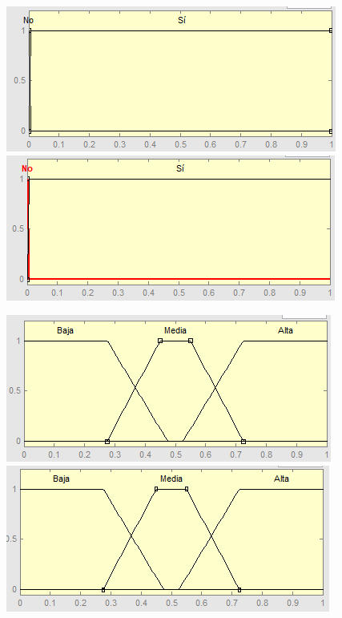 \begin{figure}[H]
	\centering
	\begin{minipage}{.5\textwidth}
		\centering
		\includegraphics[scale=0.67]{images/variables/es.png}
	\end{minipage}%
	\begin{minipage}{.5\textwidth}
		\centering
		\includegraphics[scale=0.67]{images/variables/ps.png}
	\end{minipage}
\end{figure}

\begin{figure}[H]
	\centering
	\begin{minipage}{.5\textwidth}
		\centering
		\includegraphics[scale=0.67]{images/variables/vrpa.png}
	\end{minipage}%
	\begin{minipage}{.5\textwidth}
		\centering
		\includegraphics[scale=0.67]{images/variables/vrpc.png}
	\end{minipage}
\end{figure}

